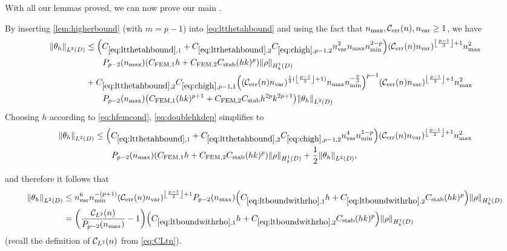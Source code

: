 \epf
With all our lemmas proved, we can now prove our main .

\label{page:thmfembound}
By inserting \cref{lem:higherbound} (with $m=p-1$) into \cref{eq:ltthetahbound} and using the fact that $\nmax, \En, \nvar \geq 1$, we have
\begin{align}
\NLtD{\thetah}&\leq \mleft(\Cfirst + \Csecond\Chighfn{p-1,2} \nvar^3\nmax\nmin^{2-p} \mright)\mleft(\En \nvar\mright)^{\floor{\frac{p-1}2}+1}\nmax^2\nonumber\\
&\quad\quad\Pfn{p-2}\mleft(\nmax\mright)\mleft(\CFEMotilde h + \CFEMttilde \CAnk (hk)^p\mright)\NHokD{\rho}\nonumber\\
&+\Csecond  \Chighfn{p-1,1} \mleft(\mleft(\En\nvar\mright)^{\half(\floor{\frac{p-1}2}+1)}\nmax\nmin^{-\frac{p}2}\mright)^{p-1}\mleft(\En \nvar\mright)^{\floor{\frac{p-1}2}+1}\nmax^2\nonumber\\
&\quad\quad\Pfn{p-2}\mleft(\nmax\mright)\mleft(\CFEMotilde (hk )^{p+1}+ \CFEMttilde \CAnk h^{2p}k^{2p+1}\mright)\NLtD{\thetah}\label{eq:doublehkdep}
\end{align}
Choosing $h$ according to \cref{eq:hfemcond}, \cref{eq:doublehkdep} simplifies to
\begin{align*}
\NLtD{\thetah} &\leq \mleft(\Cfirst + \Csecond\Chighfn{p-1,2} \nvar^4\nmin^{1-p} \mright)\mleft(\En \nvar\mright)^{\floor{\frac{p-1}2}+1}\nmax^2\\
&\quad\quad\Pfn{p-2}\mleft(\nmax\mright)\mleft(\CFEMotilde h + \CFEMttilde \CAnk (hk)^p\mright)\NHokD{\rho} + \half \NLtD{\thetah},
\end{align*}

and therefore it follows that
\begin{align}
  \NLtD{\thetah} &\leq \nvar^6\nmin^{-(p+1)} \mleft(\En \nvar\mright)^{\floor{\frac{p-1}2}+1} \Pfn{p-2}\mleft(\nmax\mright)\mleft(\CLtboundo h + \CLtboundt  \CAnk (hk)^p\mright)\NHokD{\rho}\label{eq:ltboundwithrho}\\
  &= \mleft(\frac{\CLtn(n)}{\Pfn{p-2}\mleft(\nmax\mright)}-1\mright)\mleft(\CLtboundo h + \CLtboundt  \CAnk (hk)^p\mright)\NHokD{\rho}\label{eq:ltboundwithrho2}
\end{align}
(recall the definition of $\mathcal C_{L^{2}}(n)$ from \cref{eq:CLtn}).

